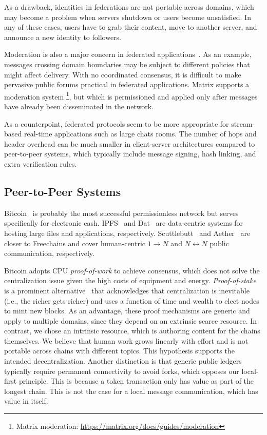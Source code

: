 \documentclass[10pt,journal,compsoc]{IEEEtran}
\newcommand{\FC}       {Freechains\xspace}
\newcommand{\Xon} {$1{\rightarrow}N$\xspace}
\newcommand{\Xnn} {$N{\leftrightarrow}N$\xspace}
\begin{document}
As a drawback, identities in federations are not portable across domains, which
may become a problem when servers shutdown or users become unsatisfied.
In any of these cases, users have to grab their content, move to another
server, and announce a new identity to followers.

Moderation is also a major concern in federated
applications~\cite{p2p.ecosystem}.
As an example, messages crossing domain boundaries may be subject to different
policies that might affect delivery.
With no coordinated consensus, it is difficult to make pervasive public forums
practical in federated applications.
%
Matrix supports a moderation system%
\footnote{Matrix moderation: \url{https://matrix.org/docs/guides/moderation}},
but which is permissioned and applied only after messages have already been
disseminated in the network.

As a counterpoint, federated protocols seem to be more appropriate for
stream-based real-time applications such as large chats rooms.
The number of hops and header overhead can be much smaller in client-server
architectures compared to peer-to-peer systems, which typically include message
signing, hash linking, and extra verification rules.

\subsection{Peer-to-Peer Systems}

Bitcoin~\cite{p2p.bitcoin} is probably the most successful permissionless
network but serves specifically for electronic cash.
IPFS~\cite{p2p.ipfs} and Dat~\cite{p2p.dat} are data-centric systems for
hosting large files and applications, respectively.
Scuttlebutt~\cite{p2p.scuttlebutt} and Aether~\cite{p2p.ecosystem} are closer
to \FC and cover human-centric \Xon and \Xnn public communication, respectively.

Bitcoin adopts CPU \emph{proof-of-work} to achieve consensus, which does not
solve the centralization issue given the high costs of equipment and energy.
\emph{Proof-of-stake} is a prominent alternative~\cite{p2p.proofs} that
acknowledges that centralization is inevitable (i.e., the richer gets richer)
and uses a function of time and wealth to elect nodes to mint new blocks.
As an advantage, these proof mechanisms are generic and apply to multiple
domains, since they depend on an extrinsic scarce resource.
%
In contrast, we chose an intrinsic resource, which is authoring content for the
chains themselves.
We believe that human work grows linearly with effort and is not portable
across chains with different topics.
This hypothesis supports the intended decentralization.
%
Another distinction is that generic public ledgers typically require permanent
connectivity to avoid forks, which opposes our local-first principle.
This is because a token transaction only has value as part of the longest
chain.
This is not the case for a local message communication, which has value in
itself.
\end{document}
